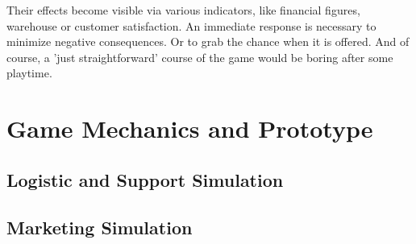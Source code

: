 \documentclass[11pt,titlepage,oneside,openany]{book}
\begin{document}
Their effects become visible via various indicators, like financial figures, warehouse or customer satisfaction. An immediate response is necessary to minimize negative consequences. Or to grab the chance when it is offered. And of course, a 'just straightforward' course of the game would be boring after some playtime. 

\chapter{Game Mechanics and Prototype}
\label{cha:alg}










\section{Logistic and Support Simulation}



\section{Marketing Simulation}
\label{markting_simulation}












\end{document}
